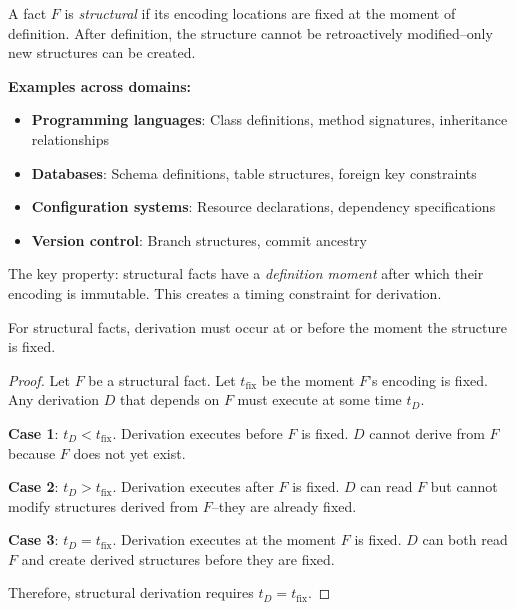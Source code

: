 \begin{definition}\label{def:structural-fact-req}
A fact $F$ is \emph{structural} if its encoding locations are fixed at the moment of definition. After definition, the structure cannot be retroactively modified--only new structures can be created.
\end{definition}

\textbf{Examples across domains:}
\begin{itemize}
\tightlist
\item \textbf{Programming languages}: Class definitions, method signatures, inheritance relationships
\item \textbf{Databases}: Schema definitions, table structures, foreign key constraints
\item \textbf{Configuration systems}: Resource declarations, dependency specifications
\item \textbf{Version control}: Branch structures, commit ancestry
\end{itemize}

The key property: structural facts have a \emph{definition moment} after which their encoding is immutable. This creates a timing constraint for derivation.

\begin{theorem}\label{thm:timing-forces}
For structural facts, derivation must occur at or before the moment the structure is fixed.
\end{theorem}

\begin{proof}
Let $F$ be a structural fact. Let $t_{\text{fix}}$ be the moment $F$'s encoding is fixed. Any derivation $D$ that depends on $F$ must execute at some time $t_D$.

\textbf{Case 1}: $t_D < t_{\text{fix}}$. Derivation executes before $F$ is fixed. $D$ cannot derive from $F$ because $F$ does not yet exist.

\textbf{Case 2}: $t_D > t_{\text{fix}}$. Derivation executes after $F$ is fixed. $D$ can read $F$ but cannot modify structures derived from $F$--they are already fixed.

\textbf{Case 3}: $t_D = t_{\text{fix}}$. Derivation executes at the moment $F$ is fixed. $D$ can both read $F$ and create derived structures before they are fixed.

Therefore, structural derivation requires $t_D = t_{\text{fix}}$.
\end{proof}

